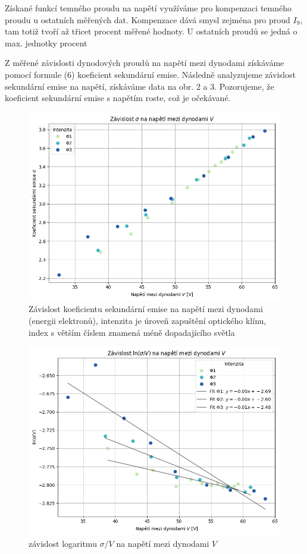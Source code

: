 \documentclass[czech,11pt,a4paper]{article}
\begin{document}
\begin{multicols}{2}
\begin{figure}[H]
		\end{figure}
		Získané funkcí temného proudu na napětí využíváme pro kompenzaci temného proudu u ostatních měřených dat. Kompenzace dává smysl zejména pro proud $I_9$, tam totiž tvoří až třicet procent měřené hodnoty. U ostatních proudů se jedná o max. jednotky procent
		
		Z měřené závislosti dynodových proudů na napětí mezi dynodami získáváme pomocí formule (6) koeficient sekundární emise. Následně analyzujeme závislost sekundární emise na napětí, získáváme data na obr. 2 a 3. Pozorujeme, že koeficient sekundární emise s napětím roste, což je očekávané.
		
		
		\begin{figure}[H]
			\centering
			\includegraphics[width=0.9\linewidth]{fig0}
			\caption{Závislost koeficientu sekundární emise na napětí mezi dynodami (energii elektronů), intenzita je úroveň zapuštění optického klínu, index s větším číslem znamená méně dopadajícího světla}
		\end{figure}
		\begin{figure}[H]
			\includegraphics[width=0.9\linewidth]{fig1}
			\caption{závislost logaritmu $\sigma / V$ na napětí mezi dynodami $V$}


\end{figure}
\end{multicols}
\end{document}
